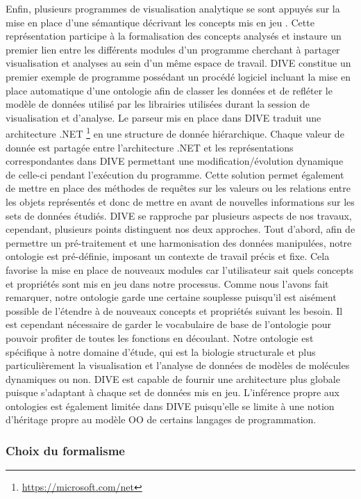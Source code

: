 Enfin, plusieurs programmes de visualisation analytique se sont appuyés sur la mise en place d'une sémantique décrivant les concepts mis en jeu \cite{rysavy_dive:_2014}. Cette représentation participe à la formalisation des concepts analysés et instaure un premier lien entre les différents modules d'un programme cherchant à partager visualisation et analyses au sein d'un même espace de travail. DIVE constitue un premier exemple de programme possédant un procédé logiciel incluant la mise en place automatique d'une ontologie afin de classer les données et de refléter le modèle de données utilisé par les librairies utilisées durant la session de visualisation et d'analyse. Le parseur mis en place dans DIVE traduit une architecture .NET \footnote{\url{https://microsoft.com/net}} en une structure de donnée hiérarchique. Chaque valeur de donnée est partagée entre l'architecture .NET et les représentations correspondantes dans DIVE permettant une modification/évolution dynamique de celle-ci pendant l’exécution du programme. Cette solution permet également de mettre en place des méthodes de requêtes sur les valeurs ou les relations entre les objets représentés et donc de mettre en avant de nouvelles informations sur les sets de données étudiés. DIVE se rapproche par plusieurs aspects de nos travaux, cependant, plusieurs points distinguent nos deux approches. Tout d'abord, afin de permettre un pré-traitement et une harmonisation des données manipulées, notre ontologie est pré-définie, imposant un contexte de travail précis et fixe. Cela favorise la mise en place de nouveaux modules car l'utilisateur sait quels concepts et propriétés sont mis en jeu dans notre processus. Comme nous l'avons fait remarquer, notre ontologie garde une certaine souplesse puisqu'il est aisément possible de l'étendre à de nouveaux concepts et propriétés suivant les besoin. Il est cependant nécessaire de garder le vocabulaire de base de l'ontologie pour pouvoir profiter de toutes les fonctions en découlant. Notre ontologie est spécifique à notre domaine d'étude, qui est la biologie structurale et plus particulièrement la visualisation et l'analyse de données de modèles de molécules dynamiques ou non. DIVE est capable de fournir une architecture plus globale puisque s'adaptant à chaque set de données mis en jeu. L'inférence propre aux ontologies est également limitée dans DIVE puisqu'elle se limite à une notion d'héritage propre au modèle OO de certains langages de programmation.

\subsubsection{Choix du formalisme}

